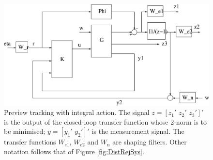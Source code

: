 \begin{description}
\begin{figure}
\begin{center}
\stdcontrolfrags
{}
\includegraphics[width=12cm]{./diags/TrackSysInteg.eps}
\end{center}
\caption{Preview tracking with integral action. The signal $z=\left[z_1'\,\,z_2'\,\,z_3'\right]'$ is the output of the closed-loop transfer function
whose 2-norm is to be minimised; $y=\left[y_1'\,\,y_2'\right]'$ is the measurement signal. The transfer functions $W_{e1}$, $W_{e2}$ and $W_n$ are shaping filters. Other notation follows that of Figure \ref{fig:DistRejSys}. \label{fig:TrackSysIntegDesign}}
\end{figure}

\end{description}